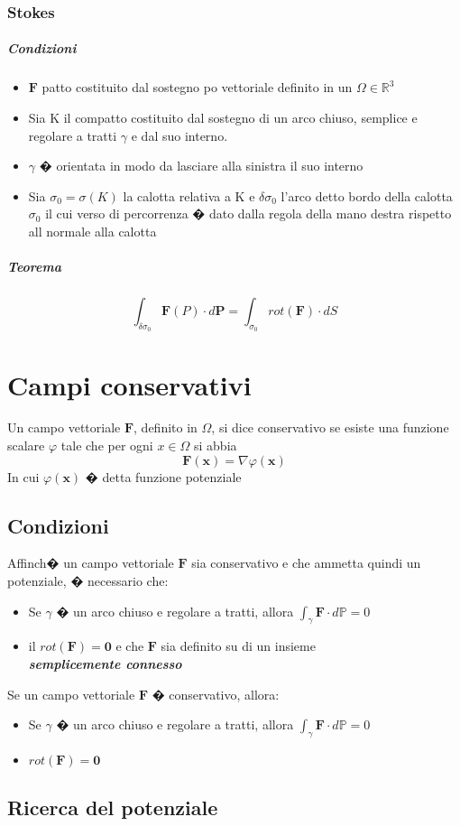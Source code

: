 \documentclass[10pt,a4paper]{report}
\begin{document}
			\subsubsection{Stokes}
			
				\subparagraph{Condizioni}
				\begin{itemize}
					\item $\mathbf{F}$ patto costituito dal sostegno po vettoriale definito in un $ \Omega \in \mathbb{R}^{3} $
					\item Sia K il compatto costituito dal sostegno di un arco chiuso, semplice e regolare a tratti $ \gamma $ e dal suo interno.
					\item $ \gamma $ � orientata in modo da lasciare alla sinistra il suo interno
					\item Sia $ \sigma_{0} = \sigma(K) $ la calotta relativa a K e $ \delta \sigma_{0} $ l'arco detto bordo della calotta $ \sigma_{0} $  il cui verso di percorrenza � dato dalla regola della mano destra  rispetto all normale alla calotta
				\end{itemize}
				\subparagraph{Teorema}
				\[ \int_{\delta \sigma_{0}} \mathbf{F}(P) \cdot d \mathbf{P} = \int_{ \sigma_{0}} rot(\mathbf{F}) \cdot d S\]




	
	\section*{Campi conservativi}
	
			Un campo vettoriale $ \mathbf{F} $, definito in $ \Omega $, si dice conservativo se 
			esiste una funzione scalare $ \varphi $ tale che per ogni $ x \in \Omega $ si abbia \[ \mathbf{F}(\mathbf{x}) = \nabla \varphi(\mathbf{x})\] In cui $ \varphi(\mathbf{x}) $ � detta funzione potenziale
			
			\subsection*{Condizioni}
			Affinch� un campo vettoriale $ \mathbf{F} $ sia conservativo e che ammetta quindi un potenziale, � necessario che:
			\begin{itemize}
				\item Se $ \gamma $ � un arco chiuso e regolare a tratti, allora $ \int_{\gamma } \mathbf{F} \cdot d\mathbb{P}  =  0$
				\item il $ rot(\mathbf{F}) = \textbf{0} $ e che $ \mathbf{F} $ sia definito su di un insieme \\ \textit{\textbf{semplicemente connesso}}
			\end{itemize}
			Se un campo vettoriale $ \mathbf{F} $ � conservativo, allora:
			\begin{itemize}
				\item Se $ \gamma $ � un arco chiuso e regolare a tratti, allora $ \int_{\gamma } \mathbf{F} \cdot d\mathbb{P}  =  0$
				\item $ rot(\mathbf{F}) = \textbf{0} $
			\end{itemize}
			\subsection*{Ricerca del potenziale}
\end{document}
